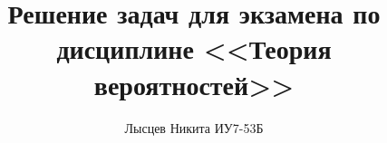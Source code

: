 \documentclass{bmstu}
\title{Решение задач для экзамена по дисциплине <<Теория вероятностей>>}
\author{Лысцев Никита ИУ7-53Б}
\begin{document}
\maketitle 

\maketableofcontents


%
\end{document}
